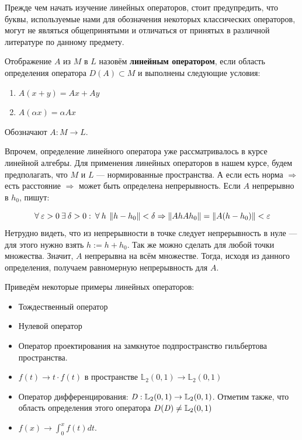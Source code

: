 \documentclass[12pt]{article}
\begin{document}
	Прежде чем начать изучение линейных операторов, стоит предупредить, что буквы, используемые нами для обозначения некоторых
	классических операторов, могут не являться общепринятыми и отличаться от принятых в различной литературе по данному предмету.
	
	\begin{defi}
		Отображение $A$ из $M$ в $L$ назовём \textbf{линейным оператором}, если область определения оператора
		$D(A) \subset M$ и выполнены следующие условия:
		\begin{enumerate}
			\item $A(x + y) = Ax + Ay$
			\item $A(\alpha x) = \alpha A x$ 
		\end{enumerate}
		Обозначают $A : M \rightarrow L$.
	\end{defi}
	
	Впрочем, определение линейного оператора уже рассматривалось в курсе линейной алгебры. Для применения линейных операторов в
	нашем курсе, будем предполагать, что $M$ и $L$ --- нормированные пространства. А если есть норма $\Rightarrow$ есть расстояние
	$\Rightarrow$ может быть определена непрерывность. Если $A$ непрерывно в $h_0$, пишут:
	
	$$ \forall \varepsilon > 0 \exists \delta > 0 : \forall h \: \norm{h - h_0} < \delta \Rightarrow \norm{Ah  Ah_0} 
	= \norm{A(h-h_0)} < \varepsilon $$
	Нетрудно видеть, что из непрерывности в точке следует непрерывность в нуле --- для этого нужно взять $h := h + h_0$. 
	Так же можно сделать для любой точки множества. Значит, $A$ непрерывна на всём множестве. Тогда, исходя из данного
	определения, получаем равномерную непрерывность для $A$.
	
	Приведём некоторые примеры линейных операторов:
	\begin{itemize}
		\item Тождественный оператор
		\item Нулевой оператор
		\item Оператор проектирования на замкнутое подпространство гильбертова пространства.
		\item $f(t) \rightarrow t \cdot f(t)$ в пространстве $\mathbb{L}_2 (0,1) \rightarrow \mathbb{L}_2 (0,1)$
		\item Оператор дифференцирования: $\text{\emph{D}}: \mathbb{L}_2 (0,1) \rightarrow \mathbb{L}_2 (0,1)$. Отметим также, что
		область определения этого оператора $D(\text{\emph{D}}) \neq \mathbb{L}_2 (0,1)$
		\item $f(x) \rightarrow \int_0^x f(t) dt$.
	\end{itemize}
	
\end{document}
